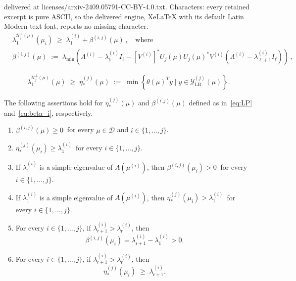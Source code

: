 \documentclass[10pt,a4paper]{amsart}
\newcommand{\sr}{\mathsf{r}}
\begin{document}
delivered at licenses/arxiv-2409.05791-CC-BY-4.0.txt. Characters: every retained excerpt is pure ASCII, so the delivered engine, XeLaTeX with its default Latin Modern text font, reports no missing character.
\begin{equation}\label{eq:beta_i}
	\begin{split}
		& \lambda^{{\mathcal U}_j^{\bot}(\mu)}_1(\mu_i)
		\;\geq\;
		\lambda^{(i)}_1 + \beta^{(i,j)}(\mu) \,, \quad \text{where} \\[0.7em]
		& \beta^{(i,j)}(\mu) \;:=\;
		\lambda_{\min} \left( 
			\Lambda^{(i)} - \lambda^{(i)}_1 I_\ell
			- [V^{(i)}]^* U_j(\mu) U_j(\mu)^* V^{(i)} (\Lambda^{(i)} - \lambda^{(i)}_{\ell+1} I_\ell)
		\right) \,,
	\end{split}
\end{equation}

\begin{equation}\label{eq:LP}
	\lambda^{{\mathcal U}_j^{\bot}(\mu)}_1(\mu)
	\;\geq\;
	\eta_\ast^{(j)}(\mu)
	\;:=\;
	\min \left\{ \theta(\mu)^T y \mid y \in \mathcal{Y}^{(j)}_{\mathrm{LB}}(\mu) \right\} .
\end{equation}

\begin{lemma}\label{lem:props_eta}
The following assertions hold for $\eta^{(j)}_\ast(\mu)$ and $\beta^{(i,j)}(\mu)$ defined as in~\eqref{eq:LP} and~\eqref{eq:beta_i}, respectively.
\begin{enumerate}
	\item\label{item1}
	$\beta^{(i,j)}(\mu) \geq 0 \:$ for every $\mu \in {\mathcal D}$ and $i \in \{ 1, \dots , j \}$.
	
	\item\label{item2}
	$\eta^{(j)}_\ast(\mu_i) \geq \lambda^{(i)}_1 \,$ for every $i \in \{ 1, \dots , j \}$.
	
	\item\label{item3}
	If $\lambda^{(i)}_1$ is a simple eigenvalue of $A(\mu^{(i)})$, then
	$\beta^{(i,j)}(\mu_i) > 0 \: $ for every $i \in  \{ 1, \dots , j \}$.
	
	\item\label{item4}
	If $\lambda^{(i)}_1$ is a simple eigenvalue of $A(\mu^{(i)})$, then
	$\eta^{(j)}_\ast(\mu_i) > \lambda^{(i)}_1 \,$ for every $i \in \{ 1, \dots , j \}$.
	
	\item
	For every $i \in \{ 1, \dots , j \}$,
	if $\lambda^{(i)}_{\sr +1} > \lambda^{(i)}_{\sr}$, then 
	\begin{equation}\label{eq:beta_lb}
		\beta^{(i,j)}(\mu_i) = \lambda^{(i)}_{\sr+1} - \lambda^{(i)}_1 > 0.
	\end{equation}

	\item \label{item6}
	For every $i \in \{ 1, \dots , j \}$,
	if $\lambda^{(i)}_{\sr +1} > \lambda^{(i)}_{\sr}$, then
	\begin{equation}\label{eq:lbound_eta}
		\eta^{(j)}_\ast(\mu_i) \;\geq\; \lambda^{(i)}_{\sr +1}.
	\end{equation}
\end{enumerate}
\end{lemma}
\end{document}
